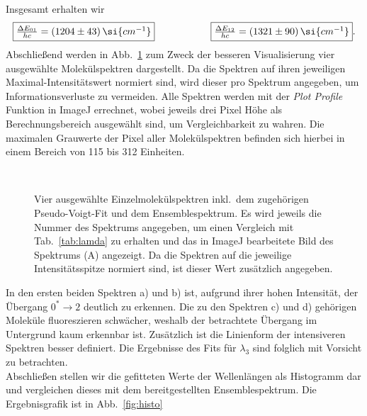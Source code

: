 Insgesamt erhalten wir
\begin{equation}
    \fbox{$\frac{\Delta{E}_{01}}{hc} = (1204\pm43)\,\si{cm^{-1}}$}\hspace{2cm}\fbox{$\frac{\Delta{E}_{12}}{hc} = (1321\pm90)\,\si{cm^{-1}}$}.
\end{equation}
Abschließend werden in Abb.~\ref{fig:spektren} zum Zweck der besseren Visualisierung vier ausgewählte Molekülspektren dargestellt.
Da die Spektren auf ihren jeweiligen Maximal-Intensitätswert normiert sind, wird dieser pro Spektrum angegeben, um Informationsverluste 
zu vermeiden. Alle Spektren werden mit der \textit{Plot Profile} Funktion in ImageJ errechnet, wobei jeweils drei Pixel Höhe 
als Berechnungsbereich ausgewählt sind, um Vergleichbarkeit zu wahren. Die maximalen Grauwerte der Pixel aller Molekülspektren 
befinden sich hierbei in einem Bereich von 115 bis 312 Einheiten.
\begin{figure}[h!]
    \centering
     \\
    \caption{\label{fig:spektren}Vier ausgewählte Einzelmolekülspektren inkl.~dem zugehörigen 
    Pseudo-Voigt-Fit und dem Ensemblespektrum. Es wird jeweils die Nummer des Spektrums angegeben, um 
    einen Vergleich mit Tab.~\ref{tab:lamda} zu erhalten und das in ImageJ bearbeitete Bild des 
    Spektrums (A) angezeigt. Da die Spektren auf die jeweilige Intensitätsspitze normiert sind, 
    ist dieser Wert zusätzlich angegeben.}
\end{figure}  \FloatBarrier
In den ersten beiden Spektren a) und b) ist, aufgrund ihrer hohen Intensität, der 
Übergang $0^{*}\rightarrow2$ deutlich zu erkennen. Die zu den Spektren c) und d) 
gehörigen Moleküle fluoreszieren schwächer, weshalb der betrachtete Übergang im Untergrund 
kaum erkennbar ist. Zusätzlich ist die Linienform der intensiveren Spektren besser definiert.
Die Ergebnisse des Fits für $\lambda_{3}$ sind folglich mit Vorsicht zu betrachten. \\
Abschließen stellen wir die gefitteten Werte der Wellenlängen als Histogramm dar und vergleichen 
dieses mit dem bereitgestellten Ensemblespektrum. Die Ergebnisgrafik ist in Abb.~\ref{fig:histo}
